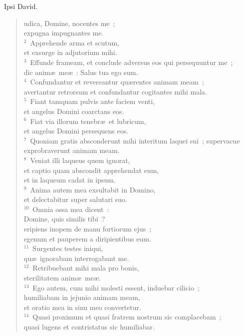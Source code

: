 \bchapter[Psalm]
Ipsi David. \begin{verse}udica, Domine, nocentes me~;\\ expugna impugnantes me.\\
${}^{2}$~Apprehende arma et scutum,\\ et exsurge in adjutorium mihi.\\
${}^{3}$~Effunde frameam, et conclude adversus eos qui persequuntur me~;\\ dic anim\ae\ me\ae~: Salus tua ego sum.\\
${}^{4}$~Confundantur et revereantur qu\ae rentes animam meam~;\\ avertantur retrorsum et confundantur cogitantes mihi mala.\\
${}^{5}$~Fiant tamquam pulvis ante faciem venti,\\ et angelus Domini coarctans eos.\\
${}^{6}$~Fiat via illorum tenebr\ae\ et lubricum,\\ et angelus Domini persequens eos.\\
${}^{7}$~Quoniam gratis absconderunt mihi interitum laquei sui~; supervacue exprobraverunt animam meam.\\
${}^{8}$~Veniat illi laqueus quem ignorat,\\ et captio quam abscondit apprehendat eum,\\ et in laqueum cadat in ipsum.\\
${}^{9}$~Anima autem mea exsultabit in Domino,\\ et delectabitur super salutari suo.\\
${}^{10}$~Omnia ossa mea dicent~:\\ Domine, quis similis tibi~?\\ eripiens inopem de manu fortiorum ejus~;\\ egenum et pauperem a diripientibus eum.\\
${}^{11}$~Surgentes testes iniqui,\\ qu\ae\ ignorabam interrogabant me.\\
${}^{12}$~Retribuebant mihi mala pro bonis,\\ sterilitatem anim\ae\ me\ae .\\
${}^{13}$~Ego autem, cum mihi molesti essent, induebar cilicio~;\\ humiliabam in jejunio animam meam,\\ et oratio mea in sinu meo convertetur.\\
${}^{14}$~Quasi proximum et quasi fratrem nostrum sic complacebam~;\\ quasi lugens et contristatus sic humiliabar.\\

\end{verse}
